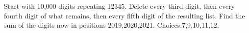 Start with 10,000 digits repeating 12345. Delete every third digit, then every fourth digit of what remains, then every fifth digit of the resulting list. Find the sum of the digits now in positions 2019,2020,2021. Choices:7,9,10,11,12.
